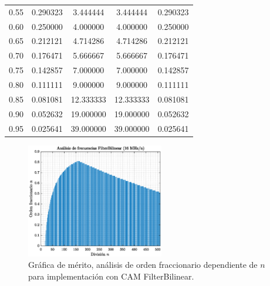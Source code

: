 \documentclass[10pt]{beamer}
\begin{document}
\begin{frame}
\begin{minipage}[b]{0.45\textwidth}
\begin{tiny}
\begin{table}[!hbp]
\begin{tabular}{ccccc}
			0.55 & 0.290323 & 3.444444 & 3.444444 & 0.290323 \\  
			                                             
			0.60 & 0.250000 & 4.000000 & 4.000000 & 0.250000 \\  
			                                              
			0.65 & 0.212121 & 4.714286 & 4.714286 & 0.212121 \\  
			                                             
			0.70 & 0.176471 & 5.666667 & 5.666667 & 0.176471 \\  
			                                              
			0.75 & 0.142857 & 7.000000 & 7.000000 & 0.142857 \\  
			                                              
			0.80 & 0.111111 & 9.000000 & 9.000000 & 0.111111 \\  
			                                             
			0.85 & 0.081081 & 12.333333 & 12.333333 & 0.081081 \\
			                                              
			0.90 & 0.052632 & 19.000000 & 19.000000 & 0.052632 \\
			                                              
			0.95 & 0.025641 & 39.000000 & 39.000000 & 0.025641 \\
			\hline                                              
			\end{tabular}                                                                
	\end{table} 
			\end{tiny}
		\end{minipage} \hfill \begin{minipage}[b]{0.45\textwidth}
			\begin{figure}[hbtp]
		\caption{Gráfica de mérito, análisis de orden fraccionario dependiente de $n$ para implementación con CAM FilterBilinear.} 
		\label{fig:T11_Analisis_de_frecuencias_FilterBilinear}
		\centering
		\includegraphics[width=6cm]{../imagenes/T11_Analisis_de_frecuencias_FilterBilinear.eps}
	\end{figure}
		\end{minipage}
	\end{frame}
\end{document}
